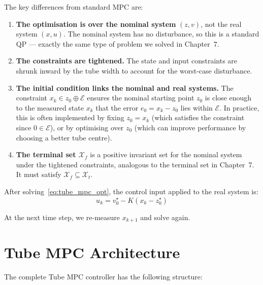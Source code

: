The key differences from standard MPC are:
\begin{enumerate}
	\item \textbf{The optimisation is over the nominal system} $(z, v)$, not the real system $(x, u)$. The nominal system has no disturbance, so this is a standard QP --- exactly the same type of problem we solved in Chapter~7.

	\item \textbf{The constraints are tightened.} The state and input constraints are shrunk inward by the tube width to account for the worst-case disturbance.

	\item \textbf{The initial condition links the nominal and real systems.} The constraint $x_k \in z_0 \oplus \mathcal{E}$ ensures the nominal starting point $z_0$ is close enough to the measured state $x_k$ that the error $e_0 = x_k - z_0$ lies within $\mathcal{E}$. In practice, this is often implemented by fixing $z_0 = x_k$ (which satisfies the constraint since $0 \in \mathcal{E}$), or by optimising over $z_0$ (which can improve performance by choosing a better tube centre).

	\item \textbf{The terminal set $\mathcal{X}_f$} is a positive invariant set for the nominal system under the tightened constraints, analogous to the terminal set in Chapter~7. It must satisfy $\mathcal{X}_f \subseteq \mathcal{X}_t$.
\end{enumerate}

After solving~\eqref{eq:tube_mpc_opt}, the control input applied to the real system is:
\begin{equation}
	u_k = v_0^\star - K(x_k - z_0^\star)
\end{equation}

At the next time step, we re-measure $x_{k+1}$ and solve again.


\section{Tube MPC Architecture}
\label{sec:tube_architecture}

The complete Tube MPC controller has the following structure:

